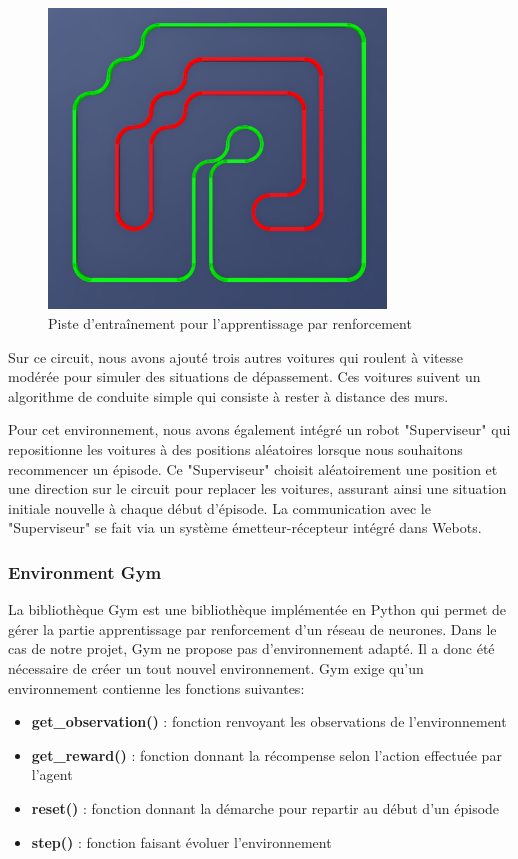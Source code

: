 \documentclass[french]{article}
\begin{document}
\begin{figure}[H]
\centering
\includegraphics[width=0.8\textwidth]{Images/Piste Entrainement.png}
\caption{Piste d'entraînement pour l'apprentissage par renforcement}
\end{figure}

Sur ce circuit, nous avons ajouté trois autres voitures qui roulent à vitesse modérée pour simuler des situations 
de dépassement. Ces voitures suivent un algorithme de conduite simple qui consiste à rester à distance des murs.

\vspace{0.5cm}
Pour cet environnement, nous avons également intégré un robot "Superviseur" qui repositionne les voitures à des 
positions aléatoires lorsque nous souhaitons recommencer un épisode. Ce "Superviseur" choisit aléatoirement 
une position et une direction sur le circuit pour replacer les voitures, assurant ainsi une situation initiale 
nouvelle à chaque début d'épisode. La communication avec le "Superviseur" se fait via un système émetteur-récepteur 
intégré dans Webots.


\subsubsection*{Environment Gym}
La bibliothèque Gym est une bibliothèque implémentée en Python qui permet de gérer la partie apprentissage par 
renforcement d'un réseau de neurones. Dans le cas de notre projet, Gym ne propose pas d'environnement adapté. 
Il a donc été nécessaire de créer un tout nouvel environnement. Gym exige qu'un environnement contienne les fonctions 
suivantes:
\begin{itemize}
    \item \textbf{get\_observation()} : fonction renvoyant les observations de l'environnement
    \item \textbf{get\_reward()} : fonction donnant la récompense selon l'action effectuée par l'agent
    \item \textbf{reset()} : fonction donnant la démarche pour repartir au début d'un épisode
    \item \textbf{step()} : fonction faisant évoluer l'environnement
\end{itemize}
\end{document}
